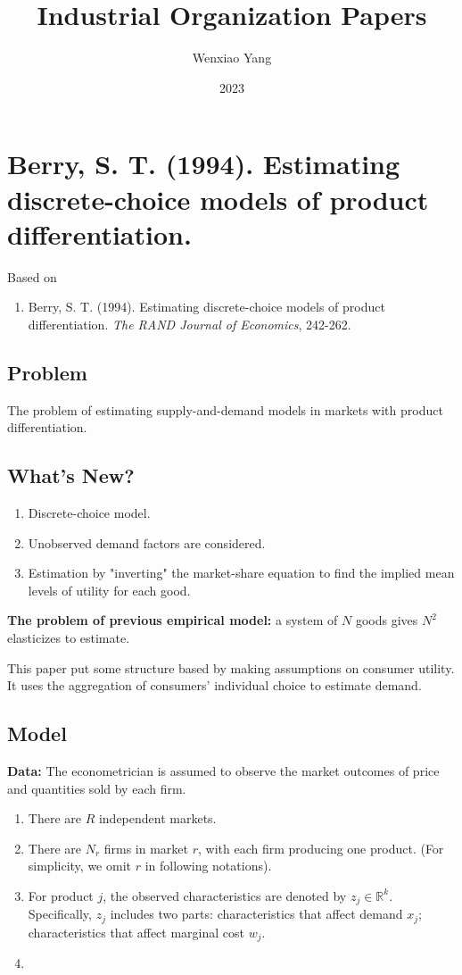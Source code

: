 \documentclass[11pt]{elegantbook}
\title{\textbf{Industrial Organization Papers}}
\author{Wenxiao Yang}
\institute{Haas School of Business, University of California Berkeley}
\date{2023}
\begin{document}
\maketitle
\frontmatter
\tableofcontents
\mainmatter


\chapter{Berry, S. T. (1994). Estimating discrete-choice models of product differentiation.}
Based on
\begin{enumerate}[$\circ$]
    \item Berry, S. T. (1994). Estimating discrete-choice models of product differentiation. \textit{The RAND Journal of Economics}, 242-262.
\end{enumerate}


\section{Problem}
The problem of estimating supply-and-demand models in markets with product differentiation.


\section{What's New?}
\begin{enumerate}
    \item Discrete-choice model.
    \item Unobserved demand factors are considered.
    \item Estimation by "inverting" the market-share equation to find the implied mean levels of utility for each good.
\end{enumerate}
\begin{note}
    \textbf{The problem of previous empirical model:} a system of $N$ goods gives $N^2$ elasticizes to estimate.
\end{note}
This paper put some structure based by making assumptions on consumer utility. It uses the aggregation of consumers' individual choice to estimate demand.

\section{Model}
\textbf{Data:} The econometrician is assumed to observe the market outcomes of price and quantities sold by each firm.

\begin{enumerate}
    \item There are $R$ independent markets.
    \item There are $N_r$ firms in market $r$, with each firm producing one product. (For simplicity, we omit $r$ in following notations).
    \item For product $j$, the observed characteristics are denoted by $z_{j}\in \mathbb{R}^k$. Specifically, $z_j$ includes two parts:
    \subitem characteristics that affect demand $x_j$;
    \subitem characteristics that affect marginal cost $w_j$.
    \item 
\end{enumerate}
\end{document}
